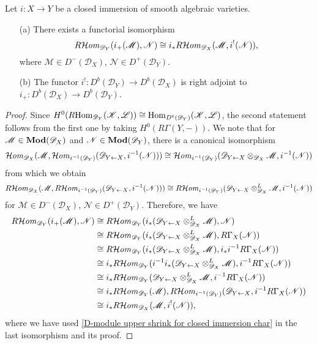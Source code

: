 \begin{proposition}\label{D-module closed immersion direct image adjunction prop}
Let $i:X\to Y$ be a closed immersion of smooth algebraic varieties.
\begin{enumerate}
    \item[(a)] There exists a functorial isomorphism
    \[R\!\operatorname{\mathcal{H}\hspace*{-0.4pt}\textit{om}\hspace{0.5pt}}_{\mathscr{D}_Y}(i_+(\mathscr{M}),\mathscr{N})\cong i_*R\!\operatorname{\mathcal{H}\hspace*{-0.4pt}\textit{om}\hspace{0.5pt}}_{\mathscr{D}_X}(\mathscr{M},i^!(\mathscr{N})),\]
    where $\mathscr{M}\in D^-(\mathscr{D}_X)$, $\mathscr{N}\in D^+(\mathscr{D}_Y)$.
    \item[(b)] The functor $i^!:D^b(\mathscr{D}_Y)\to D^b(\mathscr{D}_X)$ is right adjoint to $i_+:D^b(\mathscr{D}_X)\to D^b(\mathscr{D}_Y)$.
\end{enumerate}
\end{proposition}
\begin{proof}
Since $H^0(R\mathrm{Hom}_{\mathscr{D}_Y}(\mathscr{K},\mathscr{L}))\cong\mathrm{Hom}_{D^b(\mathscr{D}_Y)}(\mathscr{K},\mathscr{L})$, the second statement follows from the first one by taking $H^0(R\Gamma(Y,-))$. We note that for $\mathscr{M}\in\mathbf{Mod}(\mathscr{D}_X)$ and $\mathscr{N}\in\mathbf{Mod}(\mathscr{D}_Y)$, there is a canonical isomorphism
\[\operatorname{\mathcal{H}\hspace*{-0.4pt}\textit{om}\hspace{0.5pt}}_{\mathscr{D}_X}(\mathscr{M},\operatorname{\mathcal{H}\hspace*{-0.4pt}\textit{om}\hspace{0.5pt}}_{i^{-1}(\mathscr{D}_Y)}(\mathscr{D}_{Y\leftarrow X},i^{-1}(\mathscr{N})))\cong \operatorname{\mathcal{H}\hspace*{-0.4pt}\textit{om}\hspace{0.5pt}}_{i^{-1}(\mathscr{D}_Y)}(\mathscr{D}_{Y\leftarrow X}\otimes_{\mathscr{D}_X}\mathscr{M},i^{-1}(\mathscr{N}))\]
from which we obtain
\[R\!\operatorname{\mathcal{H}\hspace*{-0.4pt}\textit{om}\hspace{0.5pt}}_{\mathscr{D}_X}(\mathscr{M},R\!\operatorname{\mathcal{H}\hspace*{-0.4pt}\textit{om}\hspace{0.5pt}}_{i^{-1}(\mathscr{D}_Y)}(\mathscr{D}_{Y\leftarrow X},i^{-1}(\mathscr{N})))\cong R\!\operatorname{\mathcal{H}\hspace*{-0.4pt}\textit{om}\hspace{0.5pt}}_{i^{-1}(\mathscr{D}_Y)}(\mathscr{D}_{Y\leftarrow X}\otimes_{\mathscr{D}_X}^L\mathscr{M},i^{-1}(\mathscr{N}))\]
for $\mathscr{M}\in D^-(\mathscr{D}_X)$, $\mathscr{N}\in D^+(\mathscr{D}_Y)$. Therefore, we have
\begin{align*}
R\!\sHom_{\mathscr{D}_Y}(i_+(\mathscr{M}),\mathscr{N})&\cong R\!\sHom_{\mathscr{D}_Y}(i_*(\mathscr{D}_{Y\leftarrow X}\otimes_{\mathscr{D}_X}^L\mathscr{M}),\mathscr{N})\\
&\cong R\!\sHom_{\mathscr{D}_Y}(i_*(\mathscr{D}_{Y\leftarrow X}\otimes_{\mathscr{D}_X}^L\mathscr{M}),R\Gamma_X(\mathscr{N}))\\
&\cong R\!\sHom_{\mathscr{D}_Y}(i_*(\mathscr{D}_{Y\leftarrow X}\otimes_{\mathscr{D}_X}^L\mathscr{M}),i_*i^{-1}R\Gamma_X(\mathscr{N}))\\
&\cong i_*R\!\sHom_{\mathscr{D}_Y}(i^{-1}i_*(\mathscr{D}_{Y\leftarrow X}\otimes_{\mathscr{D}_X}^L\mathscr{M}),i^{-1}R\Gamma_X(\mathscr{N}))\\
&\cong i_*R\!\sHom_{\mathscr{D}_Y}(\mathscr{D}_{Y\leftarrow X}\otimes_{\mathscr{D}_X}^L\mathscr{M},i^{-1}R\Gamma_X(\mathscr{N}))\\
&\cong i_*R\!\sHom_{\mathscr{D}_Y}(\mathscr{M}),R\!\sHom_{i^{-1}(\mathscr{D}_Y)}(\mathscr{D}_{Y\leftarrow X},i^{-1}R\Gamma_X(\mathscr{N}))\\
&\cong i_*R\!\sHom_{\mathscr{D}_X}(\mathscr{M},i^!(\mathscr{N})),
\end{align*}
where we have used \cref{D-module upper shrink for closed immersion char} in the last isomorphism and its proof.
\end{proof}

